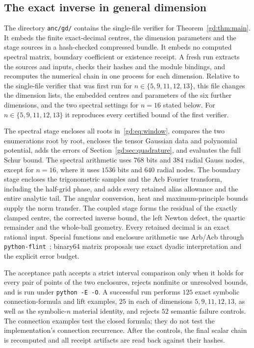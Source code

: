 \subsection{The exact inverse in general dimension}\label{gd:sec:verification}
The directory \texttt{anc/gd/} contains the single-file verifier
 for Theorem~\ref{gd:thm:main}.
It embeds the finite exact-decimal centres, the dimension parameters
and the stage sources in a hash-checked compressed bundle.
It embeds no computed spectral matrix, boundary coefficient or
existence receipt. A fresh run extracts the sources and inputs,
checks their hashes and the module bindings, and recomputes the
numerical chain in one process for each dimension.
Relative to the single-file verifier that was first run for $n\in\{5,9,11,12,13\}$,
this file changes the dimension lists, the embedded centres and parameters
of the six further dimensions, and the two spectral settings for $n=16$
stated below. For $n\in\{5,9,11,12,13\}$ it reproduces every certified
bound of the first verifier.

The spectral stage encloses all roots in~\eqref{gd:eq:window},
compares the two enumerations root by root, encloses the tensor
Gaussian data and polynomial potential, adds the errors of
Section~\ref{gd:sec:quadrature}, and evaluates the full Schur bound.
The spectral arithmetic uses $768$ bits and $384$ radial Gauss nodes,
except for $n=16$, where it uses $1536$ bits and $640$ radial nodes.
The boundary stage encloses the trigonometric samples and the
Acb Fourier transform, including the half-grid phase, and adds
every retained alias allowance and the entire analytic tail.
The angular conversion, heat and maximum-principle bounds supply
the norm transfer. The coupled stage forms the residual of the
exactly clamped centre, the corrected inverse bound, the left
Newton defect, the quartic remainder and the whole-ball geometry.
Every retained decimal is an exact rational input.
Special functions and enclosure arithmetic use Arb/Acb through
\texttt{python-flint}~\cite{flint,Joh17}; binary64 matrix proposals
use exact dyadic interpretation and the explicit error budget.

The acceptance path accepts a strict interval comparison only when it holds for every
pair of points of the two enclosures,
rejects nonfinite or unresolved bounds, and is run under
\texttt{python -E -O}. A successful run performs $125$ exact symbolic connection-formula and
lift examples, $25$ in each of dimensions $5,9,11,12,13$, as well as the
symbolic-$n$ material identity, and rejects $52$ semantic failure controls.
The connection examples test the closed formula; they do not test
the implementation's connection recurrence.
After the controls, the final scalar chain is recomputed and all
receipt artifacts are read back against their hashes.

